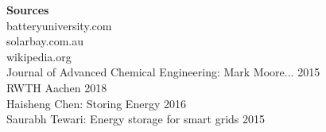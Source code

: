 \textbf{Sources} \\batteryuniversity.com\\
solarbay.com.au\\
wikipedia.org\\
Journal of Advanced Chemical Engineering: Mark Moore... 2015\\
RWTH Aachen 2018\\
Haisheng Chen: Storing Energy 2016\\
Saurabh Tewari: Energy storage for smart grids 2015\\
\clearpage
\cfoot{}